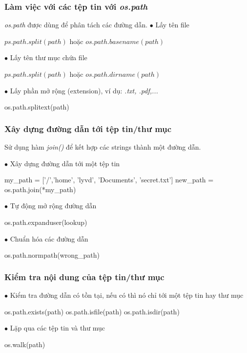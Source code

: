 \documentclass{beamer}
\begin{document}
\begin{frame}[label=lamviecteptin]
\frametitle{Làm việc với các tệp tin với \textit{os.path}}
\textit{os.path} được dùng để phân tách các đường dẫn. 
$\bullet$ Lấy tên file
\begin{example}
$ps.path.split(path)$ hoặc
$os.path.basename(path)$
\end{example}
$\bullet$ Lấy tên thư mục chứa file
\begin{example}
$ps.path.split(path)$ hoặc
$os.path.dirname(path)$
\end{example}
$\bullet$ Lấy phần mở rộng (extension), ví dụ: \textit{.txt, .pdf,...}
\begin{example}
os.path.splitext(path)
\end{example}
\hyperlink{teptin}{}
\end{frame}

\begin{frame}[label=xaydungduongdan]
\frametitle{Xây dựng đường dẫn tới tệp tin/thư mục}
Sử dụng hàm \textit{join()} để kết hợp các strings thành một đường dẫn. 

$\bullet$ Xây dựng đường dẫn tới một tệp tin
\begin{example}
my\_path = ['/','home', 'lyvd', 'Documents', 'secret.txt']\newline
new\_path = os.path.join(*my\_path)
\end{example}
$\bullet$ Tự động mở rộng đường dẫn 
\begin{example}
os.path.expanduser(lookup)
\end{example}
$\bullet$ Chuẩn hóa các đường dẫn 
\begin{example}
os.path.normpath(wrong\_path)
\end{example}
\hyperlink{teptin}{}
\end{frame}

\begin{frame}[label=kiemtranoidung]
\frametitle{Kiểm tra nội dung của tệp tin/thư mục}
$\bullet$ Kiểm tra đường dẫn có tồn tại, nếu có thì nó chỉ tới một tệp tin hay thư mục
\begin{example}
os.path.exists(path)\newline
os.path.isfile(path)\newline
os.path.isdir(path)
\end{example}
$\bullet$ Lặp qua các tệp tin và thư mục  
\begin{example}
os.walk(path)
\end{example}

\hyperlink{teptin}{}
\end{frame}
\end{document}
